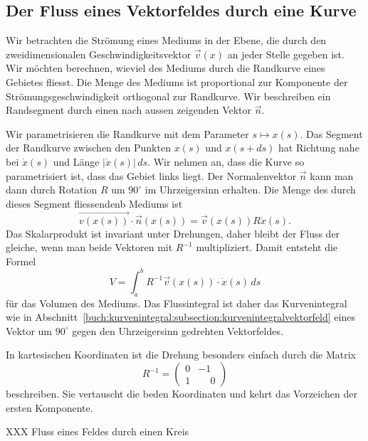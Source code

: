 %
%
\subsection{Der Fluss eines Vektorfeldes durch eine Kurve}
Wir betrachten die Strömung eines Mediums in der Ebene, die durch
den zweidimensionalen Geschwindigkeitsvektor $\vec{v}(x)$ an jeder
Stelle gegeben ist.
Wir möchten berechnen, wieviel des Mediums durch die Randkurve
eines Gebietes fliesst.
Die Menge des Mediums ist proportional zur Komponente der
Strömungsgeschwindigkeit orthogonal zur Randkurve.
Wir beschreiben ein Randsegment durch einen nach aussen
zeigenden Vektor $\vec{n}$.

Wir parametrisieren die Randkurve mit dem Parameter $s\mapsto x(s)$.
Das Segment der Randkurve zwischen den Punkten $x(s)$ und $x(s+ds)$
hat Richtung nahe bei $\dot{x}(s)$ und Länge $|\dot{x}(s)|\,ds$.
Wir nehmen an, dass die Kurve so parametrisiert ist, dass das Gebiet
links liegt.
Der Normalenvektor $\vec{n}$ kann man dann durch Rotation $R$ um
$90^\circ$ im Uhrzeigersinn erhalten.
Die Menge des durch dieses Segment fliessendenb Mediums ist
\[
\vec{v(x(s))}\cdot \vec{n}(x(s))
=
\vec{v}(x(s)) R\dot{x}(s).
\]
Das Skalarprodukt ist invariant unter Drehungen, daher bleibt der
Fluss der gleiche, wenn man beide Vektoren mit $R^{-1}$ multipliziert.
Damit entsteht die Formel
\[
V
=
\int_a^b 
R^{-1}\vec{v}(x(s))\cdot \dot{x}(s)
\,ds
\]
für das Volumen des Mediums.
Das Flussintegral ist daher das Kurvenintegral wie in
Abschnitt~\ref{buch:kurvenintegral:subsection:kurvenintegralvektorfeld}
eines Vektor um $90^\circ$ gegen den Uhrzeigersinn gedrehten
Vektorfeldes.

In kartesischen Koordinaten ist die Drehung besonders einfach durch
die Matrix 
\[
R^{-1}
=
\begin{pmatrix}
0&-1\\
1&\phantom{-}0
\end{pmatrix}
\]
beschreiben.
Sie vertauscht die beden Koordinaten und kehrt das Vorzeichen
der ersten Komponente.

\begin{beispiel}
XXX Fluss eines Feldes durch einen Kreis
\end{beispiel}

